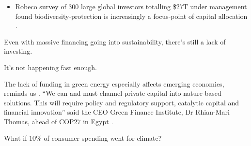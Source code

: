 \documentclass[
  letterpaper,
  DIV=11,
  numbers=noendperiod]{scrartcl}
\providecommand{\tightlist}{%
  \setlength{\itemsep}{0pt}\setlength{\parskip}{0pt}}\usepackage{longtable,booktabs,array}
\begin{document}
\begin{itemize}
\tightlist
\item
  Robeco survey of 300 large global investors totalling \$27T under
  management found biodiversity-protection is increasingly a focus-point
  of capital allocation \citep{robeco2023GlobalClimate2023}.
\end{itemize}

Even with massive financing going into sustainability, there's still a
lack of investing.

It's not happening fast enough.

The lack of funding in green energy especially affects emerging
economies, reminds us \citet{MobilizingCapitalEmerging2022}. ``We can
and must channel private capital into nature-based solutions. This will
require policy and regulatory support, catalytic capital and financial
innovation'' said the CEO Green Finance Institute, Dr Rhian-Mari Thomas,
ahead of COP27 in Egypt \citep{GreenFinanceInstitute2023}.

What if 10\% of consumer spending went for climate?
\end{document}
